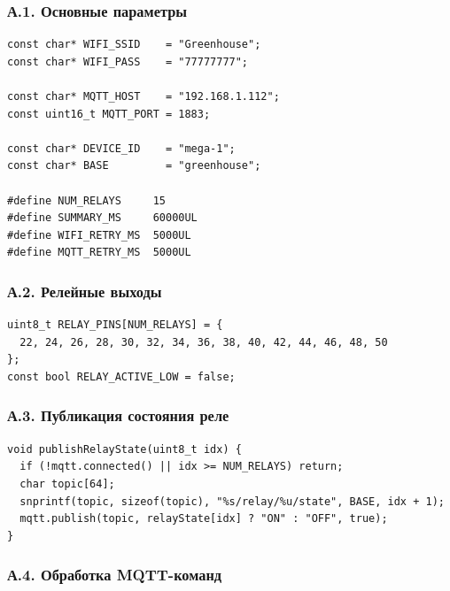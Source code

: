 \documentclass[a4paper,14pt]{extarticle}
\begin{document}
\subsubsection{А.1. Основные
параметры}\label{ux430.1.-ux43eux441ux43dux43eux432ux43dux44bux435-ux43fux430ux440ux430ux43cux435ux442ux440ux44b}

\begin{verbatim}
const char* WIFI_SSID    = "Greenhouse";
const char* WIFI_PASS    = "77777777";

const char* MQTT_HOST    = "192.168.1.112";
const uint16_t MQTT_PORT = 1883;

const char* DEVICE_ID    = "mega-1";
const char* BASE         = "greenhouse";

#define NUM_RELAYS     15
#define SUMMARY_MS     60000UL
#define WIFI_RETRY_MS  5000UL
#define MQTT_RETRY_MS  5000UL
\end{verbatim}

\subsubsection{А.2. Релейные
выходы}\label{ux430.2.-ux440ux435ux43bux435ux439ux43dux44bux435-ux432ux44bux445ux43eux434ux44b}

\begin{verbatim}
uint8_t RELAY_PINS[NUM_RELAYS] = {
  22, 24, 26, 28, 30, 32, 34, 36, 38, 40, 42, 44, 46, 48, 50
};
const bool RELAY_ACTIVE_LOW = false;
\end{verbatim}

\subsubsection{А.3. Публикация состояния
реле}\label{ux430.3.-ux43fux443ux431ux43bux438ux43aux430ux446ux438ux44f-ux441ux43eux441ux442ux43eux44fux43dux438ux44f-ux440ux435ux43bux435}

\begin{verbatim}
void publishRelayState(uint8_t idx) {
  if (!mqtt.connected() || idx >= NUM_RELAYS) return;
  char topic[64];
  snprintf(topic, sizeof(topic), "%s/relay/%u/state", BASE, idx + 1);
  mqtt.publish(topic, relayState[idx] ? "ON" : "OFF", true);
}
\end{verbatim}

\subsubsection{А.4. Обработка
MQTT-команд}\label{ux430.4.-ux43eux431ux440ux430ux431ux43eux442ux43aux430-mqtt-ux43aux43eux43cux430ux43dux434}
\end{document}
